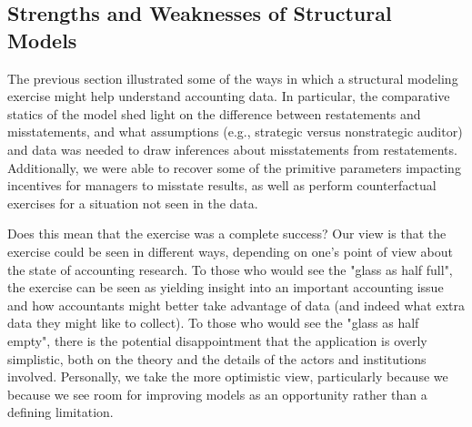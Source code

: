 \documentclass[14pt]{article}
\begin{document}
\subsection{Strengths and Weaknesses of Structural Models}

The previous section illustrated some of the ways in which a structural modeling exercise might help understand
accounting data. In particular, the comparative statics of the model shed light on the difference between restatements
and misstatements, and what assumptions (e.g., strategic versus nonstrategic auditor) and data was needed to draw 
inferences about misstatements from restatements. Additionally, we were able to recover some of the primitive parameters
impacting incentives for managers to misstate results, as well as perform counterfactual exercises for a situation not
seen in the data.

Does this mean that the exercise was a complete success? Our view is that the exercise could be seen
in different ways, depending on one's point of view about the state of accounting research. To those
who would see the  "glass as half full", the exercise can be seen as yielding insight into an important
accounting issue and how accountants might better take advantage of data (and indeed what extra
data they might like to collect). To those who would see the  "glass as half empty", there is the potential
disappointment that the application is overly simplistic, both on the theory and the details of the
actors and institutions involved. Personally, we take the more optimistic view, particularly because we
because we see room for improving models as an opportunity rather than a defining limitation.
\end{document}
